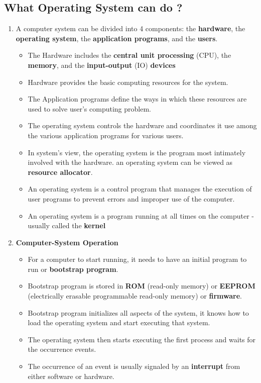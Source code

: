 \documentclass[10pt]{article}
\begin{document}
\subsection{What Operating System can do ?}
\begin{enumerate}
	\item A computer system can be divided into 4 components: the \textbf{hardware}, the \textbf{operating system}, the \textbf{application programs}, and the \textbf{users}.
	\begin{itemize}
		\item The Hardware includes the \textbf{central unit processing} (CPU), the \textbf{memory}, and the \textbf{input-output} (IO) \textbf{devices}
		\item Hardware provides the basic computing resources for the system.
		\item The Application programs define the ways in which these resources are used to solve user's computing problem.
		\item The operating system controls the hardware and coordinates it use among the various application programs for various users.
		\item In system's view, the operating system is the program most intimately involved with the hardware. an operating system can be viewed as \textbf{resource allocator}.
		\item An operating system is a control program that manages the execution of user programs to prevent errors and improper use of the computer.
		\item An operating system is a program running at all times on the computer - usually called the \textbf{kernel}
	\end{itemize}

	\item \textbf{Computer-System Operation} 
	\begin{itemize}
		\item For a computer to start running, it needs to have an initial program to run or \textbf{bootstrap program}.
		\item Bootstrap program is stored in \textbf{ROM} (read-only memory) or \textbf{EEPROM} (electrically erasable programmable read-only memory) or \textbf{firmware}.
		\item Bootstrap program initializes all aspects of the system, it knows how to load the operating system and start executing that system.
		\item The operating system then starts executing the first process and waits for the occurrence events.
		\item The occurrence of an event is usually signaled by an \textbf{interrupt} from either software or hardware.


\end{itemize}
\end{enumerate}
\end{document}
